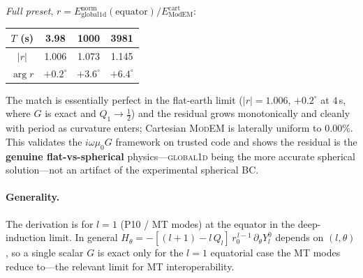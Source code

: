 \documentclass[11pt]{article}
\newcommand{\Emodem}{E_{\mathrm{ModEM}}}
\newcommand{\Eg}{E_{\mathrm{global1d}}}
\begin{document}
\emph{Full preset}, $r=\Eg^{\mathrm{norm}}(\text{equator})/\Emodem^{\mathrm{cart}}$:
\begin{center}
\begin{tabular}{cccc}
\toprule
$T$ (s) & 3.98 & 1000 & 3981\\
\midrule
$|r|$ & 1.006 & 1.073 & 1.145\\
$\arg r$ & $+0.2^\circ$ & $+3.6^\circ$ & $+6.4^\circ$\\
\bottomrule
\end{tabular}
\end{center}
The match is essentially perfect in the flat-earth limit ($|r|=1.006$, $+0.2^\circ$ at $4\,$s, where
$G$ is exact and $Q_1\to\tfrac12$) and the residual grows monotonically and cleanly with period as
curvature enters; Cartesian \textsc{ModEM} is laterally uniform to $0.00\%$. This validates the
$i\omega\mu_0G$ framework on trusted code and shows the residual is the \textbf{genuine
flat-vs-spherical} physics---\textsc{global1d} being the more accurate spherical solution---not an
artifact of the experimental spherical BC.

\paragraph{Generality.} The derivation is for $l=1$ (P10 / MT modes) at the equator in the
deep-induction limit. In general $H_\theta=-[(l+1)-l\,Q_l]\,r_0^{\,l-1}\,\partial_\theta Y_l^0$
depends on $(l,\theta)$, so a single scalar $G$ is exact only for the $l=1$ equatorial case the MT
modes reduce to---the relevant limit for MT interoperability.
\end{document}
